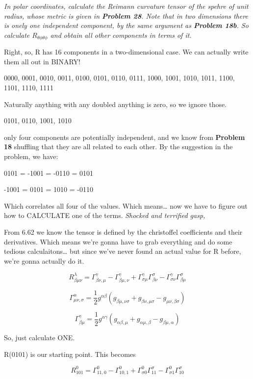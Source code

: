 \documentclass[landscape,letterpaper,10pt,english]{article}
\begin{document}
\[\label{P29}\]

\emph{In polar coordinates, calculate the Reimann curvature tensor of
the spehre of unit radius, whose metric is given in \textbf{Problem 28}.
Note that in two dimensions there is onely one independent component, by
the same argument as \textbf{Problem 18b}. So calculate
\(R_{\theta\phi\theta\phi}\) and obtain all other components in terms of
it.}

    Right, so, R has 16 components in a two-dimensional case. We can
actually write them all out in BINARY!

0000, 0001, 0010, 0011, 0100, 0101, 0110, 0111, 1000, 1001, 1010, 1011,
1100, 1101, 1110, 1111

Naturally anything with any doubled anything is zero, so we ignore
those.

0101, 0110, 1001, 1010

only four components are potentially independent, and we know from
\textbf{Problem 18} shuffling that they are all related to each other.
By the suggestion in the problem, we have:

0101 = -1001 = -0110 = 0101

-1001 = 0101 = 1010 = -0110

Which correlates all four of the values. Which means\ldots{} now we have
to figure out how to CALCULATE one of the terms. \emph{Shocked and
terrified gasp,}

    From 6.62 we know the tensor is defined by the christoffel coefficients
and their derivatives. Which means we're gonna have to grab everything
and do some tedious calculaitons\ldots{} but since we've never found an
actual value for R before, we're gonna actually do it.

\[ R^\lambda_{\beta\mu\nu} = \Gamma^\gamma_{\beta\nu,\mu} - \Gamma^\gamma_{\beta\mu,\nu} + \Gamma^\gamma_{\sigma\mu} \Gamma^\sigma_{\beta\nu} - \Gamma^\gamma_{\sigma\nu} \Gamma^\sigma_{\beta\mu}  \]

\[ \Gamma^\alpha_{\mu\nu,\sigma}  = \frac12 g^{\alpha\beta} \left( g_{\beta\mu,\nu\sigma} + g_{\beta\nu,\mu\sigma} - g_{\mu\nu,\beta\sigma} \right) \]

\[ \Gamma^\gamma_{\beta\mu} = \frac{1}{2} g^{\alpha\gamma} (g_{\alpha\beta,\mu} + g_{\alpha\mu,\beta} - g_{\beta\mu,\alpha})  \]

    So, just calculate ONE.

R(0101) is our starting point. This becomes

\[R^0_{101} = \Gamma^0_{11,0} - \Gamma^0_{10,1} + \Gamma^0_{\sigma 0} \Gamma^\sigma_{11} - \Gamma^0_{\sigma 1} \Gamma^\sigma_{10} \]
\end{document}
